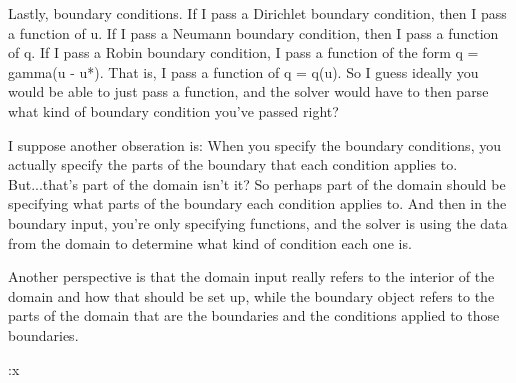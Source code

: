 \documentclass{amsart}
\begin{document}
Lastly, boundary conditions. If I pass a Dirichlet boundary condition, then I
pass a function of u. If I pass a Neumann boundary condition, then I pass a
function of q. If I pass a Robin boundary condition, I pass a function of the
form q = gamma(u - u*). That is, I pass a function of q = q(u). So I guess
ideally you would be able to just pass a function, and the solver would have to
then parse what kind of boundary condition you've passed right? 

I suppose another obseration is: When you specify the boundary conditions, you
actually specify the parts of the boundary that each condition applies to.
But...that's part of the domain isn't it? So perhaps part of the domain should
be specifying what parts of the boundary each condition applies to. And then in
the boundary input, you're only specifying functions, and the solver is using
the data from the domain to determine what kind of condition each one is. 

Another perspective is that the domain input really refers to the interior of
the domain and how that should be set up, while the boundary object refers to
the parts of the domain that are the boundaries and the conditions applied to
those boundaries. 

:x
\end{document}
